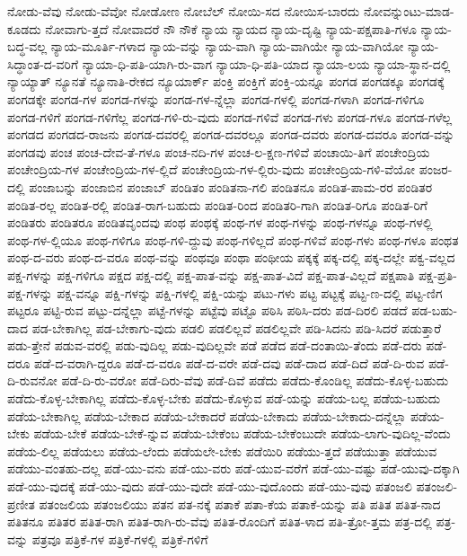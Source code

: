 {ನೋಡು-ವೆವು
ನೋಡು-ವೆವೋ
ನೋಡೋಣ
ನೋಬೆಲ್
ನೋಯಿ-ಸದ
ನೋಯಿಸ-ಬಾರದು
ನೋವನ್ನುಂಟು-ಮಾಡ-ಕೂಡದು
ನೋವಾಗು-ತ್ತದೆ
ನೋವಾದರೆ
ನೌ
ನೌಕೆ
ನ್ಯಾಯ
ನ್ಯಾಯದ
ನ್ಯಾಯ-ದೃಷ್ಟಿ
ನ್ಯಾಯ-ಪಕ್ಷಪಾತಿ-ಗಳೂ
ನ್ಯಾಯ-ಬದ್ಧ-ವಲ್ಲ
ನ್ಯಾಯ-ಮೂರ್ತಿ-ಗಳಾದ
ನ್ಯಾಯ-ವನ್ನು
ನ್ಯಾಯ-ವಾಗಿ
ನ್ಯಾಯ-ವಾಗಿಯೇ
ನ್ಯಾಯ-ವಾಗಿಯೋ
ನ್ಯಾಯ-ಸಿದ್ಧಾಂತ-ದ-ವರಿಗೆ
ನ್ಯಾಯಾ-ಧಿ-ಪತಿ-ಯಾಗಿ-ರು-ವಾಗ
ನ್ಯಾಯಾ-ಧಿ-ಪತಿ-ಯಾದ
ನ್ಯಾಯಾ-ಲಯ
ನ್ಯಾಯಾ-ಸ್ಥಾನ-ದಲ್ಲಿ
ನ್ಯಾಯ್ಯಾತ್
ನ್ಯೂನತೆ
ನ್ಯೂನಾತಿ-ರೇಕದ
ನ್ಯೂಯಾರ್ಕ್
ಪಂಕ್ತಿ
ಪಂಕ್ತಿಗೆ
ಪಂಕ್ತಿ-ಯನ್ನೂ
ಪಂಗಡ
ಪಂಗಡಕ್ಕೂ
ಪಂಗಡಕ್ಕೆ
ಪಂಗಡಕ್ಕೇ
ಪಂಗಡ-ಗಳ
ಪಂಗಡ-ಗಳನ್ನು
ಪಂಗಡ-ಗಳ-ನ್ನೆಲ್ಲಾ
ಪಂಗಡ-ಗಳಲ್ಲಿ
ಪಂಗಡ-ಗಳಾಗಿ
ಪಂಗಡ-ಗಳಿಗೂ
ಪಂಗಡ-ಗಳಿಗೆ
ಪಂಗಡ-ಗಳಿಗೆಲ್ಲ
ಪಂಗಡ-ಗಳಿ-ರು-ವುದು
ಪಂಗಡ-ಗಳಿವೆ
ಪಂಗಡ-ಗಳು
ಪಂಗಡ-ಗಳೂ
ಪಂಗಡ-ಗಳೆಲ್ಲ
ಪಂಗಡದ
ಪಂಗಡದ-ರಾಜನು
ಪಂಗಡ-ದವರಲ್ಲಿ
ಪಂಗಡ-ದವರಲ್ಲೂ
ಪಂಗಡ-ದವರು
ಪಂಗಡ-ದವರೂ
ಪಂಗಡ-ವನ್ನು
ಪಂಗಡವು
ಪಂಚ
ಪಂಚ-ದೇವ-ತೆ-ಗಳೂ
ಪಂಚ-ನದಿ-ಗಳ
ಪಂಚ-ಲ-ಕ್ಷಣ-ಗಳಿವೆ
ಪಂಚಾಯಿ-ತಿಗೆ
ಪಂಚೇಂದ್ರಿಯ
ಪಂಚೇಂದ್ರಿಯ-ಗಳ
ಪಂಚೇಂದ್ರಿಯ-ಗಳ-ಲ್ಲಿದೆ
ಪಂಚೇಂದ್ರಿಯ-ಗಳ-ಲ್ಲಿರು-ವುದು
ಪಂಚೇಂದ್ರಿಯ-ಗಳಿ-ವೆಯೋ
ಪಂಜರ-ದಲ್ಲಿ
ಪಂಜಾಬನ್ನು
ಪಂಜಾಬಿನ
ಪಂಜಾಬ್
ಪಂಡಿತಂ
ಪಂಡಿತನಾ-ಗಲಿ
ಪಂಡಿತನೂ
ಪಂಡಿತ-ಪಾಮ-ರರ
ಪಂಡಿತರ
ಪಂಡಿತ-ರಲ್ಲ
ಪಂಡಿತ-ರಲ್ಲಿ
ಪಂಡಿತ-ರಾಗ-ಬಹುದು
ಪಂಡಿತ-ರಿಂದ
ಪಂಡಿತರಿ-ಗಾಗಿ
ಪಂಡಿತ-ರಿಗೂ
ಪಂಡಿತ-ರಿಗೆ
ಪಂಡಿತರು
ಪಂಡಿತರೂ
ಪಂಡಿತವೃಂದವು
ಪಂಥ
ಪಂಥಕ್ಕೆ
ಪಂಥ-ಗಳ
ಪಂಥ-ಗಳನ್ನು
ಪಂಥ-ಗಳನ್ನೂ
ಪಂಥ-ಗಳಲ್ಲಿ
ಪಂಥ-ಗಳ-ಲ್ಲಿಯೂ
ಪಂಥ-ಗಳಿಗೂ
ಪಂಥ-ಗಳಿ-ದ್ದುವು
ಪಂಥ-ಗಳಿಲ್ಲದೆ
ಪಂಥ-ಗಳಿವೆ
ಪಂಥ-ಗಳು
ಪಂಥ-ಗಳೂ
ಪಂಥತ
ಪಂಥ-ದ-ವರು
ಪಂಥ-ದ-ವರೂ
ಪಂಥ-ವನ್ನು
ಪಂಥವೂ
ಪಂಥಾ
ಪಂಥೀಯ
ಪಕ್ಕಕ್ಕೆ
ಪಕ್ಕ-ದಲ್ಲಿ
ಪಕ್ಕ-ದಲ್ಲೇ
ಪಕ್ವ-ವಲ್ಲದ
ಪಕ್ಷ-ಗಳನ್ನು
ಪಕ್ಷ-ಗಳಿಗೂ
ಪಕ್ಷದ
ಪಕ್ಷ-ದಲ್ಲಿ
ಪಕ್ಷ-ಪಾತ-ವನ್ನು
ಪಕ್ಷ-ಪಾತ-ವಿದೆ
ಪಕ್ಷ-ಪಾತ-ವಿಲ್ಲದೆ
ಪಕ್ಷಪಾತಿ
ಪಕ್ಷ-ಪ್ರತಿ-ಪಕ್ಷ-ಗಳನ್ನು
ಪಕ್ಷ-ವನ್ನೂ
ಪಕ್ಷಿ-ಗಳನ್ನು
ಪಕ್ಷಿ-ಗಳಲ್ಲಿ
ಪಕ್ಷಿ-ಯನ್ನು
ಪಟು-ಗಳು
ಪಟ್ಟ
ಪಟ್ಟಕ್ಕೆ
ಪಟ್ಟ-ಣ-ದಲ್ಲಿ
ಪಟ್ಟ-ಣಿಗ
ಪಟ್ಟರೂ
ಪಟ್ಟಿ-ರುವ
ಪಟ್ಟು-ದನ್ನೆಲ್ಲಾ
ಪಟ್ಟೆ-ಗಳನ್ನು
ಪಟ್ಟೆವು
ಪಟ್ಟೊ
ಪಠಿಸಿ
ಪಠಿಸಿ-ದರು
ಪಡ-ದಿರಲಿ
ಪಡದೆ
ಪಡ-ಬಹು-ದಾದ
ಪಡ-ಬೇಕಾಗಿಲ್ಲ
ಪಡ-ಬೇಕಾಗು-ವುದು
ಪಡಲಿ
ಪಡಲಿಲ್ಲವೆ
ಪಡಲಿಲ್ಲವೇ
ಪಡಿ-ಸಿದನು
ಪಡಿ-ಸಿದರೆ
ಪಡುತ್ತಾರೆ
ಪಡು-ತ್ತೇನೆ
ಪಡುವ-ವರಲ್ಲಿ
ಪಡು-ವುದಿಲ್ಲ
ಪಡು-ವುದಿಲ್ಲವೇ
ಪಡೆ
ಪಡೆದ
ಪಡೆ-ದಂತಾಯಿ-ತೆಂದು
ಪಡೆ-ದರು
ಪಡೆ-ದರೂ
ಪಡೆ-ದ-ವರಾಗಿ-ದ್ದರೂ
ಪಡೆ-ದ-ವರೂ
ಪಡೆ-ದ-ವರೇ
ಪಡೆ-ದವು
ಪಡೆ-ದಾದ
ಪಡೆ-ದಿದೆ
ಪಡೆ-ದಿ-ರುವ
ಪಡೆ-ದಿ-ರುವನೋ
ಪಡೆ-ದಿ-ರು-ವರೋ
ಪಡೆ-ದಿರು-ವೆವು
ಪಡೆ-ದಿವೆ
ಪಡೆದು
ಪಡೆದು-ಕೊಂಡಿಲ್ಲ
ಪಡೆದು-ಕೊಳ್ಳ-ಬಹುದು
ಪಡೆದು-ಕೊಳ್ಳ-ಬೇಕಾಗಿಲ್ಲ
ಪಡೆದು-ಕೊಳ್ಳ-ಬೇಕು
ಪಡೆದು-ಕೊಳ್ಳುವ
ಪಡೆ-ಯನ್ನು
ಪಡೆಯ-ಬಲ್ಲ
ಪಡೆಯ-ಬಹುದು
ಪಡೆಯ-ಬೇಕಾಗಿಲ್ಲ
ಪಡೆಯ-ಬೇಕಾದ
ಪಡೆಯ-ಬೇಕಾದರೆ
ಪಡೆಯ-ಬೇಕಾದು
ಪಡೆಯ-ಬೇಕಾದು-ದನ್ನೆಲ್ಲಾ
ಪಡೆಯ-ಬೇಕು
ಪಡೆಯ-ಬೇಕೆ
ಪಡೆಯ-ಬೇಕೆ-ನ್ನುವ
ಪಡೆಯ-ಬೇಕೆಂಬ
ಪಡೆಯ-ಬೇಕೆಂಬುದೇ
ಪಡೆಯ-ಲಾಗು-ವುದಿಲ್ಲ-ವೆಂದು
ಪಡೆಯ-ಲಿಲ್ಲ
ಪಡೆಯಲು
ಪಡೆಯ-ಲೆಂದು
ಪಡೆಯಲೇ-ಬೇಕು
ಪಡೆಯಿರಿ
ಪಡೆಯು-ತ್ತದೆ
ಪಡೆಯುತ್ತಾ
ಪಡೆಯುವ
ಪಡೆಯು-ವಂತಹು-ದಲ್ಲ
ಪಡೆ-ಯು-ವನು
ಪಡೆ-ಯು-ವರು
ಪಡೆ-ಯುವ-ವರೆಗೆ
ಪಡೆ-ಯು-ವಷ್ಟು
ಪಡೆ-ಯುವು-ದಕ್ಕಾಗಿ
ಪಡೆ-ಯು-ವುದಕ್ಕೆ
ಪಡೆ-ಯು-ವುದು
ಪಡೆ-ಯು-ವುದೇ
ಪಡೆ-ಯು-ವುದೊಂದು
ಪಡೆ-ಯು-ವುವು
ಪತಂಜಲಿ
ಪತಂಜಲಿ-ಪ್ರಣೀತ
ಪತಂಜಲಿಯ
ಪತಂಜಲಿಯು
ಪತನ
ಪತ-ನಕ್ಕೆ
ಪತಾಕೆ
ಪತಾ-ಕೆಯ
ಪತಾಕೆ-ಯನ್ನು
ಪತಿ
ಪತಿತ
ಪತಿತ-ನಾದ
ಪತಿತನೂ
ಪತಿತರ
ಪತಿತ-ರಾಗಿ
ಪತಿತ-ರಾಗಿ-ರು-ವೆವು
ಪತಿತ-ರೊಂದಿಗೆ
ಪತಿತ-ಳಾದ
ಪತಿ-ತ್ರೋ-ತ್ತಮ
ಪತ್ರ-ದಲ್ಲಿ
ಪತ್ರ-ವನ್ನು
ಪತ್ರವೂ
ಪತ್ರಿಕೆ-ಗಳ
ಪತ್ರಿಕೆ-ಗಳಲ್ಲಿ
ಪತ್ರಿಕೆ-ಗಳಿಗೆ
}
